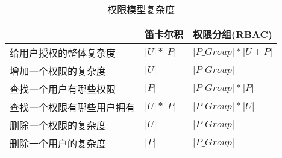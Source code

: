 \documentclass{article}
\begin{document}
\begin{CJK*}{UTF8}{gbsn}


\begin{table}[]
\caption{权限模型复杂度}
\centering
\begin{tabular}{|l|l|l|} 
\hline
    & 笛卡尔积  &      权限分组(RBAC)    \\ 
\hline
给用户授权的整体复杂度   & $|U|*|P|$ & $|P\_Group| * |U + P|$   \\
增加一个权限的复杂度 & $|U|$  & $|P\_Group|$  \\
查找一个用户有哪些权限      & $|P|$  &   $|P\_Group| * |P|$    \\
查找一个权限有哪些用户拥有    & $|U|*|P|$   &  $|P\_Group| * |U|$   \\
删除一个权限的复杂度     &  $|U|$  &  $|P\_Group|$  \\
删除一个用户的复杂度    &  $|P|$  &  $|P\_Group|$     \\
\hline
\end{tabular}
\end{table}

\end{CJK*}
\end{document}
